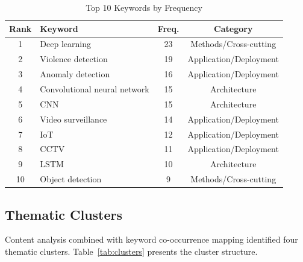 \documentclass[conference]{IEEEtran}
\begin{document}
\begin{table}[t]
\caption{Top 10 Keywords by Frequency}
\begin{center}
\footnotesize
\setlength{\tabcolsep}{4pt}
\renewcommand{\arraystretch}{1.0}
\begin{tabular}{|c|l|c|c|}
\hline
\textbf{Rank} & \textbf{Keyword} & \textbf{Freq.} & \textbf{Category} \\
\hline
1 & Deep learning & 23 & Methods/Cross-cutting \\
2 & Violence detection & 19 & Application/Deployment \\
3 & Anomaly detection & 16 & Application/Deployment \\
4 & Convolutional neural network & 15 & Architecture \\
5 & CNN & 15 & Architecture \\
6 & Video surveillance & 14 & Application/Deployment \\
7 & IoT & 12 & Application/Deployment \\
8 & CCTV & 11 & Application/Deployment \\
9 & LSTM & 10 & Architecture \\
10 & Object detection & 9 & Methods/Cross-cutting \\
\hline
\end{tabular}
\label{tab:keywords}
\end{center}
\end{table}

\subsection{Thematic Clusters}

Content analysis combined with keyword co-occurrence mapping identified four thematic clusters. Table~\ref{tab:clusters} presents the cluster structure.
\end{document}

